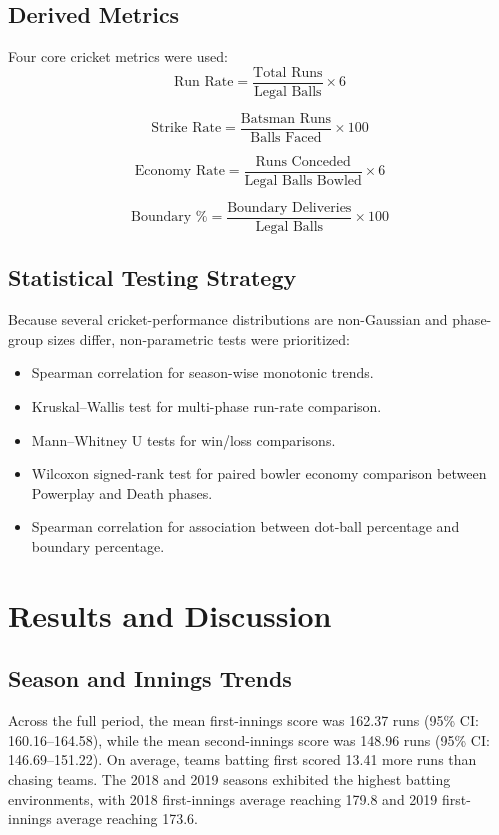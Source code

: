 \documentclass[conference]{IEEEtran}
\begin{document}
\subsection{Derived Metrics}
Four core cricket metrics were used:
\begin{equation}
\text{Run Rate} = \frac{\text{Total Runs}}{\text{Legal Balls}} \times 6
\end{equation}

\begin{equation}
\text{Strike Rate} = \frac{\text{Batsman Runs}}{\text{Balls Faced}} \times 100
\end{equation}

\begin{equation}
\text{Economy Rate} = \frac{\text{Runs Conceded}}{\text{Legal Balls Bowled}} \times 6
\end{equation}

\begin{equation}
\text{Boundary \%} = \frac{\text{Boundary Deliveries}}{\text{Legal Balls}} \times 100
\end{equation}

\subsection{Statistical Testing Strategy}
Because several cricket-performance distributions are non-Gaussian and phase-group sizes differ, non-parametric tests were prioritized:
\begin{itemize}
    \item Spearman correlation for season-wise monotonic trends.
    \item Kruskal--Wallis test for multi-phase run-rate comparison.
    \item Mann--Whitney U tests for win/loss comparisons.
    \item Wilcoxon signed-rank test for paired bowler economy comparison between Powerplay and Death phases.
    \item Spearman correlation for association between dot-ball percentage and boundary percentage.
\end{itemize}

\section{Results and Discussion}
\subsection{Season and Innings Trends}
Across the full period, the mean first-innings score was 162.37 runs (95\% CI: 160.16--164.58), while the mean second-innings score was 148.96 runs (95\% CI: 146.69--151.22). On average, teams batting first scored 13.41 more runs than chasing teams. The 2018 and 2019 seasons exhibited the highest batting environments, with 2018 first-innings average reaching 179.8 and 2019 first-innings average reaching 173.6.
\end{document}
